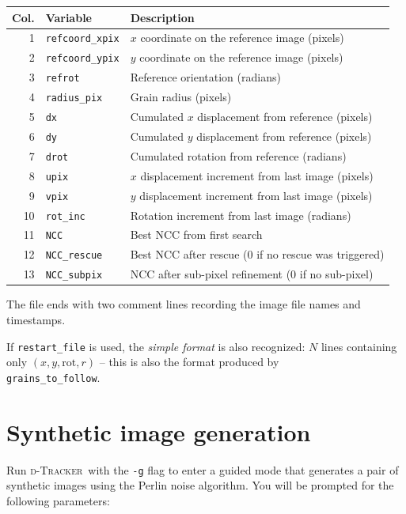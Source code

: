 \documentclass{simpledoc}
\newcommand{\soft}{\textsc{d-Tracker}}
\newcommand{\scr}[1]{\texttt{\color{myblue}#1}}
\begin{document}
\begin{center}
\begin{tabular}{rlp{7cm}}
\textbf{Col.} & \textbf{Variable} & \textbf{Description} \\
\hline
1 & \scr{refcoord\_xpix} & $x$ coordinate on the reference image (pixels) \\
2 & \scr{refcoord\_ypix} & $y$ coordinate on the reference image (pixels) \\
3 & \scr{refrot} & Reference orientation (radians) \\
4 & \scr{radius\_pix} & Grain radius (pixels) \\
5 & \scr{dx} & Cumulated $x$ displacement from reference (pixels) \\
6 & \scr{dy} & Cumulated $y$ displacement from reference (pixels) \\
7 & \scr{drot} & Cumulated rotation from reference (radians) \\
8 & \scr{upix} & $x$ displacement increment from last image (pixels) \\
9 & \scr{vpix} & $y$ displacement increment from last image (pixels) \\
10 & \scr{rot\_inc} & Rotation increment from last image (radians) \\
11 & \scr{NCC} & Best NCC from first search \\
12 & \scr{NCC\_rescue} & Best NCC after rescue (0 if no rescue was triggered) \\
13 & \scr{NCC\_subpix} & NCC after sub-pixel refinement (0 if no sub-pixel) \\
\hline
\end{tabular}
\end{center}

The file ends with two comment lines recording the image file names and timestamps.

If \scr{restart\_file} is used, the \emph{simple format} is also recognized:
$N$ lines containing only $(x, y, \mathrm{rot}, r)$ -- this is also the format produced by\\
\scr{grains\_to\_follow}.

\section{Synthetic image generation}

Run \soft\ with the \texttt{-g} flag to enter a guided mode that generates a pair of synthetic
images using the Perlin noise algorithm.
You will be prompted for the following parameters:
\end{document}
